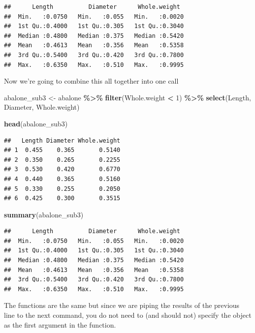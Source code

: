 \documentclass[
]{book}
\newenvironment{Shaded}{\begin{snugshade}}{\end{snugshade}}
\newcommand{\DecValTok}[1]{\textcolor[rgb]{0.00,0.00,0.81}{#1}}
\newcommand{\FunctionTok}[1]{\textcolor[rgb]{0.13,0.29,0.53}{\textbf{#1}}}
\newcommand{\NormalTok}[1]{#1}
\newcommand{\OtherTok}[1]{\textcolor[rgb]{0.56,0.35,0.01}{#1}}
\newcommand{\SpecialCharTok}[1]{\textcolor[rgb]{0.81,0.36,0.00}{\textbf{#1}}}
\begin{document}
\begin{verbatim}
##      Length          Diameter      Whole.weight   
##  Min.   :0.0750   Min.   :0.055   Min.   :0.0020  
##  1st Qu.:0.4000   1st Qu.:0.305   1st Qu.:0.3040  
##  Median :0.4800   Median :0.375   Median :0.5420  
##  Mean   :0.4613   Mean   :0.356   Mean   :0.5358  
##  3rd Qu.:0.5400   3rd Qu.:0.420   3rd Qu.:0.7800  
##  Max.   :0.6350   Max.   :0.510   Max.   :0.9995
\end{verbatim}

Now we're going to combine this all together into one call

\begin{Shaded}
\begin{Highlighting}[]
\NormalTok{abalone\_sub3 }\OtherTok{\textless{}{-}}\NormalTok{ abalone }\SpecialCharTok{\%\textgreater{}\%} 
  \FunctionTok{filter}\NormalTok{(Whole.weight }\SpecialCharTok{\textless{}} \DecValTok{1}\NormalTok{) }\SpecialCharTok{\%\textgreater{}\%} 
  \FunctionTok{select}\NormalTok{(Length, Diameter, Whole.weight)}

\FunctionTok{head}\NormalTok{(abalone\_sub3)}
\end{Highlighting}
\end{Shaded}

\begin{verbatim}
##   Length Diameter Whole.weight
## 1  0.455    0.365       0.5140
## 2  0.350    0.265       0.2255
## 3  0.530    0.420       0.6770
## 4  0.440    0.365       0.5160
## 5  0.330    0.255       0.2050
## 6  0.425    0.300       0.3515
\end{verbatim}

\begin{Shaded}
\begin{Highlighting}[]
\FunctionTok{summary}\NormalTok{(abalone\_sub3)}
\end{Highlighting}
\end{Shaded}

\begin{verbatim}
##      Length          Diameter      Whole.weight   
##  Min.   :0.0750   Min.   :0.055   Min.   :0.0020  
##  1st Qu.:0.4000   1st Qu.:0.305   1st Qu.:0.3040  
##  Median :0.4800   Median :0.375   Median :0.5420  
##  Mean   :0.4613   Mean   :0.356   Mean   :0.5358  
##  3rd Qu.:0.5400   3rd Qu.:0.420   3rd Qu.:0.7800  
##  Max.   :0.6350   Max.   :0.510   Max.   :0.9995
\end{verbatim}

The functions are the same but since we are piping the results of the previous line to the next command, you do not need to (and should not) specify the object as the first argument in the function.
\end{document}
